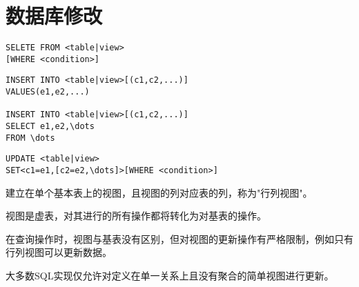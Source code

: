 \section{数据库修改}

\begin{lstlisting}[style=sqlstyle]
SELETE FROM <table|view>
[WHERE <condition>]    
\end{lstlisting}

\begin{lstlisting}[style=sqlstyle]
INSERT INTO <table|view>[(c1,c2,...)]
VALUES(e1,e2,...)

INSERT INTO <table|view>[(c1,c2,...)]
SELECT e1,e2,\dots
FROM \dots
\end{lstlisting}

\begin{lstlisting}[style=sqlstyle]
UPDATE <table|view>
SET<c1=e1,[c2=e2,\dots]>[WHERE <condition>]    
\end{lstlisting}

建立在单个基本表上的视图，且视图的列对应表的列，称为"行列视图"。

视图是虚表，对其进行的所有操作都将转化为对基表的操作。

在查询操作时，视图与基表没有区别，但对视图的更新操作有严格限制，例如只有行列视图可以更新数据。

大多数SQL实现仅允许对定义在单一关系上且没有聚合的简单视图进行更新。
